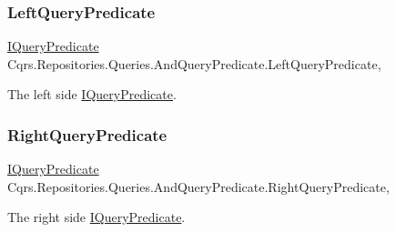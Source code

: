 \subsubsection{\texorpdfstring{Left\+Query\+Predicate}{LeftQueryPredicate}}
{\footnotesize\ttfamily \hyperlink{interfaceCqrs_1_1Repositories_1_1Queries_1_1IQueryPredicate}{I\+Query\+Predicate} Cqrs.\+Repositories.\+Queries.\+And\+Query\+Predicate.\+Left\+Query\+Predicate\hspace{0.3cm}{\ttfamily [get]}, {\ttfamily [set]}}



The left side \hyperlink{interfaceCqrs_1_1Repositories_1_1Queries_1_1IQueryPredicate}{I\+Query\+Predicate}. 

\mbox{\label{classCqrs_1_1Repositories_1_1Queries_1_1AndQueryPredicate_aa55816927e363ba4e7e313ad30ac2c2e_aa55816927e363ba4e7e313ad30ac2c2e}} 
\subsubsection{\texorpdfstring{Right\+Query\+Predicate}{RightQueryPredicate}}
{\footnotesize\ttfamily \hyperlink{interfaceCqrs_1_1Repositories_1_1Queries_1_1IQueryPredicate}{I\+Query\+Predicate} Cqrs.\+Repositories.\+Queries.\+And\+Query\+Predicate.\+Right\+Query\+Predicate\hspace{0.3cm}{\ttfamily [get]}, {\ttfamily [set]}}



The right side \hyperlink{interfaceCqrs_1_1Repositories_1_1Queries_1_1IQueryPredicate}{I\+Query\+Predicate}. 

